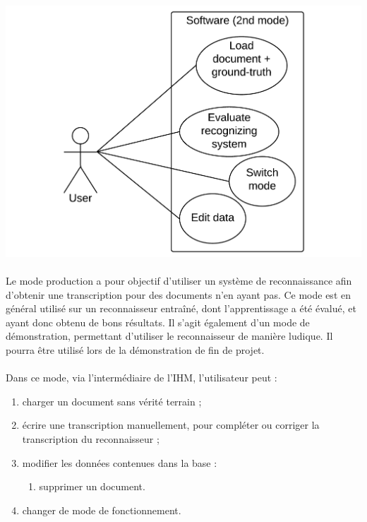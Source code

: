 \paragraph{}

\begin{mdframed}[frametitle={Figure 3 : Diagramme de cas d'utilisation (mode évaluation)}, innerbottommargin=10]
\begin{center}
\includegraphics[scale=0.6]{Usecase_2.pdf}
\end{center}
\end{mdframed}

\paragraph{}
Le mode production a pour objectif d’utiliser un système de reconnaissance afin
d’obtenir une transcription pour des documents n’en ayant pas. Ce mode est en
général utilisé sur un reconnaisseur entraîné, dont l’apprentissage a été
évalué, et ayant donc obtenu de bons résultats. Il s’agit également d’un mode
de démonstration, permettant d’utiliser le reconnaisseur de manière ludique.
Il pourra être utilisé lors de la démonstration de fin de projet.

\paragraph{}
Dans ce mode, via l'intermédiaire de l’IHM, l’utilisateur peut :
\begin{enumerate}
\item charger un document sans vérité terrain ;
\item écrire une transcription manuellement, pour compléter ou corriger la
transcription du reconnaisseur ;
\item modifier les données contenues dans la base :
\begin{enumerate}
\item supprimer un document.
\end{enumerate}
\item changer de mode de fonctionnement.
\end{enumerate}

